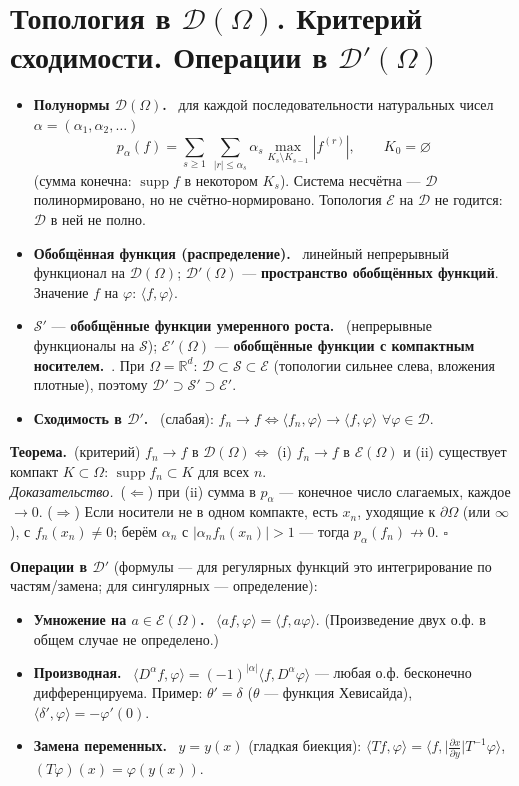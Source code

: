 \documentclass[11pt,a4paper]{article}
\newcommand{\RR}{\mathbb R}
\newcommand{\DD}{\mathcal D}
\newcommand{\EE}{\mathcal E}
\newcommand{\Sc}{\mathcal S}
\newcommand{\supp}{\operatorname{supp}}
\newcommand{\df}[1]{\textbf{#1.}~}
\newcommand{\thm}{\textbf{Теорема.}~}
\newcommand{\pf}{\textit{Доказательство.}~}
\newcommand{\qedd}{\hfill$\square$}
\begin{document}
\section{Топология в $\DD(\Omega)$. Критерий сходимости. Операции в $\DD'(\Omega)$}
\begin{defs}
\begin{itemize}
\item \df{Полунормы $\DD(\Omega)$} для каждой последовательности натуральных чисел $\alpha=(\alpha_1,\alpha_2,\dots)$
\[p_\alpha(f)=\sum_{s\ge1}\ \sum_{|r|\le\alpha_s}\alpha_s\max_{K_s\setminus K_{s-1}}|f^{(r)}|,\qquad K_0=\varnothing\]
(сумма конечна: $\supp f$ в некотором $K_s$). Система несчётна — $\DD$ полинормировано, но не счётно-нормировано. Топология $\EE$ на $\DD$ не годится: $\DD$ в ней не полно.
\item \df{Обобщённая функция (распределение)} линейный непрерывный функционал на $\DD(\Omega)$; $\DD'(\Omega)$ — \textbf{пространство обобщённых функций}. Значение $f$ на $\varphi$: $\langle f,\varphi\rangle$.
\item $\Sc'$ — \df{обобщённые функции умеренного роста} (непрерывные функционалы на $\Sc$); $\EE'(\Omega)$ — \df{обобщённые функции с компактным носителем}. При $\Omega=\RR^d$: $\DD\subset\Sc\subset\EE$ (топологии сильнее слева, вложения плотные), поэтому $\DD'\supset\Sc'\supset\EE'$.
\item \df{Сходимость в $\DD'$} (слабая): $f_n\to f\iff\langle f_n,\varphi\rangle\to\langle f,\varphi\rangle$ $\forall\varphi\in\DD$.
\end{itemize}
\end{defs}

\thm (критерий) $f_n\to f$ в $\DD(\Omega)\iff$ (i) $f_n\to f$ в $\EE(\Omega)$ и (ii) существует компакт $K\subset\Omega$: $\supp f_n\subset K$ для всех $n$.\\
\pf ($\Leftarrow$) при (ii) сумма в $p_\alpha$ — конечное число слагаемых, каждое $\to0$. ($\Rightarrow$) Если носители не в одном компакте, есть $x_n$, уходящие к $\partial\Omega$ (или $\infty$), с $f_n(x_n)\ne0$; берём $\alpha_n$ с $|\alpha_nf_n(x_n)|>1$ — тогда $p_\alpha(f_n)\not\to0$. \qedd

\textbf{Операции в $\DD'$} (формулы — для регулярных функций это интегрирование по частям/замена; для сингулярных — определение):
\begin{itemize}
\item \df{Умножение на $a\in\EE(\Omega)$} $\langle af,\varphi\rangle=\langle f,a\varphi\rangle$. (Произведение двух о.ф. в общем случае не определено.)
\item \df{Производная} $\langle D^\alpha f,\varphi\rangle=(-1)^{|\alpha|}\langle f,D^\alpha\varphi\rangle$ — любая о.ф. бесконечно дифференцируема. Пример: $\theta'=\delta$ ($\theta$ — функция Хевисайда), $\langle\delta',\varphi\rangle=-\varphi'(0)$.
\item \df{Замена переменных} $y=y(x)$ (гладкая биекция): $\langle Tf,\varphi\rangle=\langle f,\bigl|\tfrac{\partial x}{\partial y}\bigr|T^{-1}\varphi\rangle$, $(T\varphi)(x)=\varphi(y(x))$.
\end{itemize}
\end{document}
